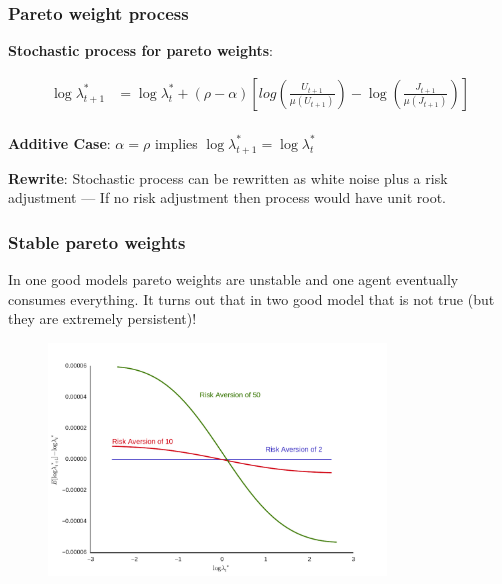 \documentclass[10pt]{beamer}
\begin{document}
  \begin{frame} \frametitle{Pareto weight process}

    \textbf{Stochastic process for pareto weights}:

    \begin{align*}
      \log \lambda_{t+1}^{*} &= \log \lambda_{t}^* + (\rho - \alpha) \left[ log\left( \frac{U_{t+1}}{\mu(U_{t+1})} \right) - \log \left( \frac{J_{t+1}}{\mu(J_{t+1})} \right) \right] \\
    \end{align*}

    \vspace{-0.15cm}

    \textbf{Additive Case}: $\alpha = \rho$ implies $\log \lambda_{t+1}^* = \log \lambda_t^*$

    \vspace{0.25cm}

    \textbf{Rewrite}: Stochastic process can be rewritten as white noise plus a risk adjustment ---
    If no risk adjustment then process would have unit root.

  \end{frame}

  \begin{frame} \frametitle{Stable pareto weights}

    In one good models pareto weights are unstable and one agent eventually consumes everything. It
    turns out that in two good model that is not true (but they are extremely persistent)!

    \begin{center}
      \begin{figure}[htb]
        \includegraphics[width=0.8\textwidth]{../ms/images/BCFL/policy_at_ss_one_axis.pdf}
      \end{figure}
    \end{center}

  \end{frame}
\end{document}
